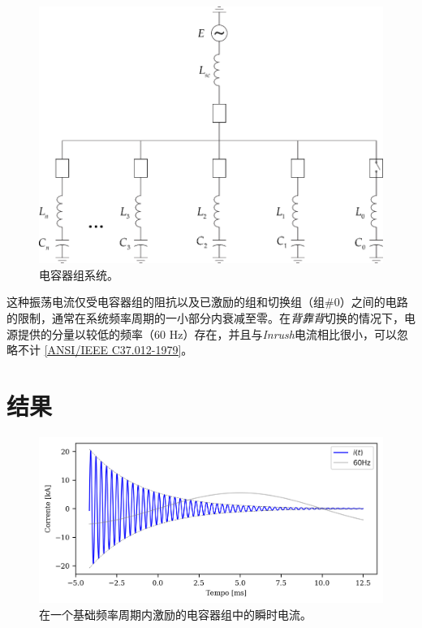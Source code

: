 \documentclass[a4paper]{article}
\begin{document}
	\begin{figure}[!hbp]
		\centering
		\includegraphics{Picture1.png}
		\caption{电容器组系统。}
		\label{fig:picture1}
	\end{figure}
	
	这种振荡电流仅受电容器组的阻抗以及已激励的组和切换组（组\#0）之间的电路的限制，通常在系统频率周期的一小部分内衰减至零。在\textit{背靠背}切换的情况下，电源提供的分量以较低的频率（60 Hz）存在，并且与\textit{Inrush}电流相比很小，可以忽略不计 \href{https://ieeexplore.ieee.org/document/7035261}{[ANSI/IEEE C37.012-1979]}。
	
	\section{结果}
	\begin{figure}[!hbp]
		\centering
		\includegraphics{Correntes.png}
		\caption{在一个基础频率周期内激励的电容器组中的瞬时电流。}
		\label{fig:picture2}
	\end{figure}
	
\end{document}
